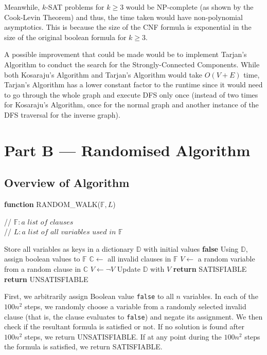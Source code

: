 \documentclass[11pt,fancychapters]{article}
\begin{document}
Meanwhile, $k$-SAT problems for $k \geq 3$ would be NP-complete (as shown by the Cook-Levin Theorem) and thus, the time taken would have non-polynomial asymptotics. This is because the size of the CNF formula is exponential in the size of the original boolean formula for $k \geq 3$.\newline

A possible improvement that could be made would be to implement Tarjan's Algorithm to conduct the search for the Strongly-Connected Components. While both Kosaraju's Algorithm and Tarjan's Algorithm would take $O(V+E)$ time, Tarjan's Algorithm has a lower constant factor to the runtime since it would need to go through the whole graph and execute DFS only once (instead of two times for Kosaraju's Algorithm, once for the normal graph and another instance of the DFS traversal for the inverse graph).

\newpage

\section{Part B --- Randomised Algorithm}
\subsection{Overview of Algorithm}
\begin{algorithm}[H]
	\caption*{\textbf{function} RANDOM\_WALK($\mathbb{F}, L$)}
	// $\mathbb{F}: \textit{a list of clauses}$\\
	// $L: \textit{a list of all variables used in } \mathbb{F}$
	\begin{algorithmic}[1]
	\State Store all variables as keys in a dictionary $\mathbb{D}$ with initial values \textbf{false}
	    \State Using $\mathbb{D}$, assign boolean values to $\mathbb{F}$
	    \State $\mathbb{C}\gets $ all invalid clauses in $\mathbb{F}$
	        \State $V\gets$ a random variable from a random clause in $\mathbb{C}$
	        \State $V\gets \neg V$
	        \State Update $\mathbb{D}$ with $V$
	   \Else
	        \State \textbf{return} SATISFIABLE
	   \EndIf
	\EndFor
	\State \textbf{return} UNSATISFIABLE
	\end{algorithmic} 
\end{algorithm}

First, we arbitrarily assign Boolean value \texttt{false} to all $n$ variables. In each of the $100n^2$ steps, we randomly choose a variable from a randomly selected invalid clause (that is, the clause evaluates to \texttt{false}) and negate its assignment. We then check if the resultant formula is satisfied or not. If no solution is found after $100n^2$ steps, we return UNSATISFIABLE. If at any point during the $100n^2$ steps the formula is satisfied, we return SATISFIABLE.
\end{document}
